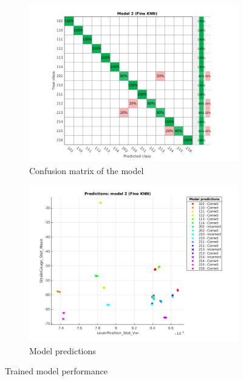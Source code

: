 \documentclass[class=article, crop=false]{standalone}
\begin{document}
\begin{figure}[h!]
    \centering    
    \begin{subfigure}{.5\textwidth}
        \centering
        \includegraphics[width=1.1\textwidth]{conf_matrix_kw_ranked.png}
        \caption{Confusion matrix of the model}
        \label{fig:conf}
    \end{subfigure}%
    \begin{subfigure}{.5\textwidth}
        \centering
        \includegraphics[width=1.1\textwidth]{model_kw_ranked_pca.png}
        \caption{Model predictions}
        \label{fig:pred}
    \end{subfigure}
    \caption{Trained model performance}
    \label{model}
\end{figure}
\end{document}
